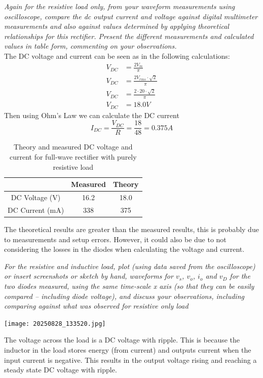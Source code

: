 \documentclass[12pt,a4paper]{article}
\begin{document}
\textit{Again for the resistive load only, from your waveform measurements using oscilloscope, compare
the dc output current and voltage against digital multimeter measurements and also against values
determined by applying theoretical relationships for this rectifier. Present the different measurements
and calculated values in table form, commenting on your observations.}\\

The DC voltage and current can be seen as in the following calculations:
\begin{align*}
V_{DC} &= \frac{2V_m}{\pi} \\
V_{DC} &= \frac{2V_{rms}\cdot\sqrt{2}}{\pi} \\
V_{DC} &= \frac{2 \cdot 20\cdot\sqrt{2}}{\pi} \\
V_{DC} &= 18.0V
\end{align*}
Then using Ohm's Law we can calculate the DC current
\[I_{DC} = \frac{V_{DC}}{R} = \frac{18}{48} = 0.375A\]

\begin{table}[H]
\caption{Theory and measured DC voltage and current for full-wave rectifier with purely resistive load \label{tab:table2}}
\centering
\begin{tabular}{|c|c|c|}
\hline
 & Measured & Theory\\
\hline
DC Voltage (V) & 16.2 & 18.0\\
\hline
DC Current (mA) & 338 & 375\\
\hline
\end{tabular}
\end{table}

The theoretical results are greater than the measured results, this is probably due to measurements and setup errors. However, it could also be due to not considering the losses in the diodes when calculating the voltage and current.

\textit{For the resistive and inductive load, plot (using data saved from the oscilloscope) or insert
screenshots or sketch by hand, waveforms for $v_s$, $v_o$, $i_o$ and $v_D$ for the two diodes measured, using
the same time-scale x axis (so that they can be easily compared – including diode voltage), and
discuss your observations, including comparing against what was observed for resistive only load}\\

\begin{center}
\texttt{[image: 20250828\_133520.jpg]}
\caption{\(V_s\), \(V_o\) and \(I_o\) for a full-wave rectifier with resistive and inductive load \label{fig:figure3}}
\end{center}
The voltage across the load is a DC voltage with ripple. This is because the inductor in the load stores energy (from current) and outputs current when the input current is negative. This results in the output voltage rising and reaching a steady state DC voltage with ripple.
\end{document}
